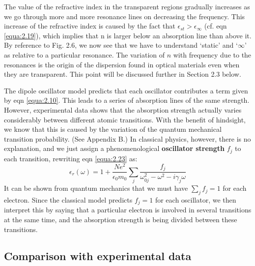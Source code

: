 \documentclass[12pt]{book}
\begin{document}
The value of the refractive index in the transparent regions gradually increases as we go through more and more resonance lines on decreasing the frequency. This increase of the refractive index is caused by the fact that $\epsilon_{st}>\epsilon_{\infty}$ (cf. eqn \ref{equa:2.19}), which implies that n is larger below an absorption line than above it. By reference to Fig. 2.6, we now see that we have to understand `static' and `$\infty$' as relative to a particular resonance. The variation of $n$ with frequency due to the resonances is the origin of the dispersion found in optical materials even when they are transparent. This point will be discussed further in Section 2.3 below.

The dipole oscillator model predicts that each oscillator contributes a term given by eqn \ref{equa:2.10}. This leads to a series of absorption lines of the same strength. However, experimental data shows that the absorption strength actually varies considerably between different atomic transitions. With the benefit of hindsight, we know that this is caused by the variation of the quantum mechanical transition probability. (See Appendix B.) In classical physics, however, there is no explanation, and we just assign a phenomenological \textbf{oscillator strength} $f_j$ to each transition, rewriting eqn \ref{equa:2.23} as:
\begin{equation}\label{equa:2.24}
  \epsilon_r(\omega)=1+\frac{Ne^2}{\epsilon_0m_0}\sum_j\frac{f_j}{\omega_{0j}^2-\omega^2-i\gamma_j\omega}
\end{equation}
It can be shown from quantum mechanics that we must have $\sum_jf_j=1$ for each electron. Since the classical model predicts $f_j = 1$ for each oscillator, we then interpret this by saying that a particular electron is involved in several transitions at the same time, and the absorption strength is being divided between these transitions.

\subsection{Comparison with experimental data}
\end{document}
